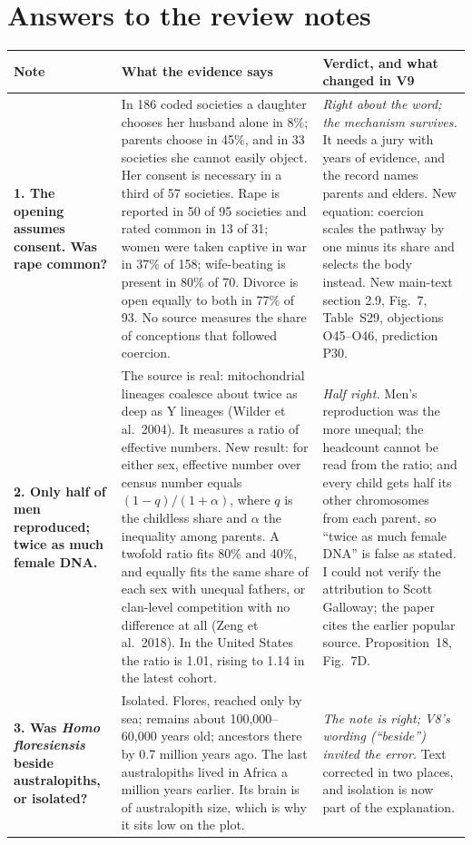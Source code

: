 \documentclass[10pt,letterpaper]{extarticle}
\newcommand{\lab}[1]{\textbf{#1}}
\begin{document}
\section{Answers to the review notes}

{\small
\begin{longtable}{@{}P{0.20\textwidth}P{0.42\textwidth}P{0.31\textwidth}@{}}
\toprule
Note & What the evidence says & Verdict, and what changed in V9\\
\midrule
\endhead
\lab{1. The opening assumes consent. Was rape common?} & In 186 coded societies a daughter chooses her husband alone in 8\%; parents choose in 45\%, and in 33 societies she cannot easily object. Her consent is necessary in a third of 57 societies. Rape is reported in 50 of 95 societies and rated common in 13 of 31; women were taken captive in war in 37\% of 158; wife-beating is present in 80\% of 70. Divorce is open equally to both in 77\% of 93. No source measures the share of conceptions that followed coercion. & \emph{Right about the word; the mechanism survives.} It needs a jury with years of evidence, and the record names parents and elders. New equation: coercion scales the pathway by one minus its share and selects the body instead. New main-text section 2.9, Fig.~7, Table~S29, objections O45--O46, prediction P30.\\
\lab{2. Only half of men reproduced; twice as much female DNA.} & The source is real: mitochondrial lineages coalesce about twice as deep as Y lineages (Wilder et al.\ 2004). It measures a ratio of effective numbers. New result: for either sex, effective number over census number equals $(1-q)/(1+\alpha)$, where $q$ is the childless share and $\alpha$ the inequality among parents. A twofold ratio fits 80\% and 40\%, and equally fits the same share of each sex with unequal fathers, or clan-level competition with no difference at all (Zeng et al.\ 2018). In the United States the ratio is 1.01, rising to 1.14 in the latest cohort. & \emph{Half right.} Men's reproduction was the more unequal; the headcount cannot be read from the ratio; and every child gets half its other chromosomes from each parent, so ``twice as much female DNA'' is false as stated. I could not verify the attribution to Scott Galloway; the paper cites the earlier popular source. Proposition~18, Fig.~7D.\\
\lab{3. Was \textit{Homo floresiensis} beside australopiths, or isolated?} & Isolated. Flores, reached only by sea; remains about 100,000--60,000 years old; ancestors there by 0.7 million years ago. The last australopiths lived in Africa a million years earlier. Its brain is of australopith size, which is why it sits low on the plot. & \emph{The note is right; V8's wording (``beside'') invited the error.} Text corrected in two places, and isolation is now part of the explanation.\\

\end{longtable}}
\end{document}
